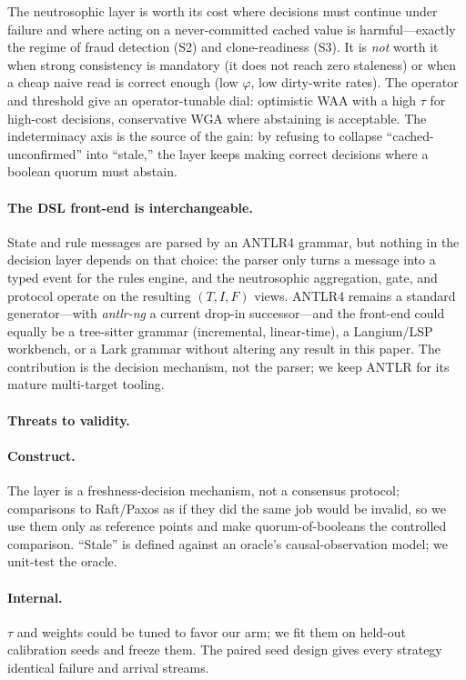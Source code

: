 \documentclass[fleqn,10pt]{wlscirep}
\begin{document}
The neutrosophic layer is worth its cost where decisions must continue under failure and where acting
on a never-committed cached value is harmful---exactly the regime of fraud detection (S2) and
clone-readiness (S3). It is \emph{not} worth it when strong consistency is mandatory (it does not reach
zero staleness) or when a cheap naive read is correct enough (low $\varphi$, low dirty-write rates).
The operator and threshold give an operator-tunable dial: optimistic WAA with a high $\tau$ for
high-cost decisions, conservative WGA where abstaining is acceptable. The indeterminacy axis is the
source of the gain: by refusing to collapse ``cached-unconfirmed'' into ``stale,'' the layer keeps
making correct decisions where a boolean quorum must abstain.

\paragraph{The DSL front-end is interchangeable.} State and rule messages are parsed by an ANTLR4
grammar, but nothing in the decision layer depends on that choice: the parser only turns a message into
a typed event for the rules engine, and the neutrosophic aggregation, gate, and protocol operate on the
resulting $(T,I,F)$ views. ANTLR4 remains a standard generator---with \emph{antlr-ng} a current drop-in
successor---and the front-end could equally be a tree-sitter grammar (incremental, linear-time), a
Langium/LSP workbench, or a Lark grammar without altering any result in this paper. The contribution is
the decision mechanism, not the parser; we keep ANTLR for its mature multi-target tooling.

\paragraph{Threats to validity.}
\label{sec:threats}

\paragraph{Construct.} The layer is a freshness-decision mechanism, not a consensus protocol;
comparisons to Raft/Paxos as if they did the same job would be invalid, so we use them only as
reference points and make quorum-of-booleans the controlled comparison. ``Stale'' is defined against an
oracle's causal-observation model; we unit-test the oracle.

\paragraph{Internal.} $\tau$ and weights could be tuned to favor our arm; we fit them on held-out
calibration seeds and freeze them. The paired seed design gives every strategy identical failure and
arrival streams.
\end{document}
